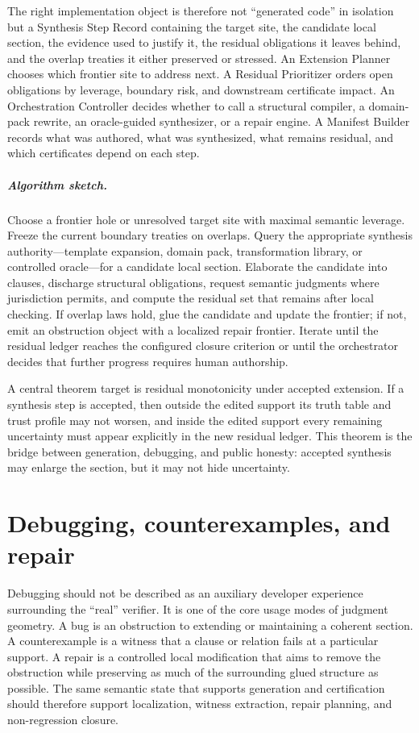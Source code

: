 \documentclass[11pt]{report}
\begin{document}
The right implementation object is therefore not ``generated code'' in isolation but a Synthesis Step Record containing the target site, the candidate local section, the evidence used to justify it, the residual obligations it leaves behind, and the overlap treaties it either preserved or stressed. An Extension Planner chooses which frontier site to address next. A Residual Prioritizer orders open obligations by leverage, boundary risk, and downstream certificate impact. An Orchestration Controller decides whether to call a structural compiler, a domain-pack rewrite, an oracle-guided synthesizer, or a repair engine. A Manifest Builder records what was authored, what was synthesized, what remains residual, and which certificates depend on each step.

\paragraph{Algorithm sketch.}
Choose a frontier hole or unresolved target site with maximal semantic leverage. Freeze the current boundary treaties on overlaps. Query the appropriate synthesis authority---template expansion, domain pack, transformation library, or controlled oracle---for a candidate local section. Elaborate the candidate into clauses, discharge structural obligations, request semantic judgments where jurisdiction permits, and compute the residual set that remains after local checking. If overlap laws hold, glue the candidate and update the frontier; if not, emit an obstruction object with a localized repair frontier. Iterate until the residual ledger reaches the configured closure criterion or until the orchestrator decides that further progress requires human authorship.

A central theorem target is residual monotonicity under accepted extension. If a synthesis step is accepted, then outside the edited support its truth table and trust profile may not worsen, and inside the edited support every remaining uncertainty must appear explicitly in the new residual ledger. This theorem is the bridge between generation, debugging, and public honesty: accepted synthesis may enlarge the section, but it may not hide uncertainty.
\chapter{Debugging, counterexamples, and repair}
Debugging should not be described as an auxiliary developer experience surrounding the ``real'' verifier. It is one of the core usage modes of judgment geometry. A bug is an obstruction to extending or maintaining a coherent section. A counterexample is a witness that a clause or relation fails at a particular support. A repair is a controlled local modification that aims to remove the obstruction while preserving as much of the surrounding glued structure as possible. The same semantic state that supports generation and certification should therefore support localization, witness extraction, repair planning, and non-regression closure.
\end{document}
